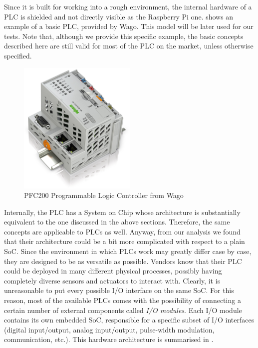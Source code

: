 Since it is built for working into a rough environment, the internal hardware of a PLC is shielded and not directly visible as the Raspberry Pi one.
\myfig{\ref{fig:wagoplc}} shows an example of a basic PLC, provided by Wago. This model will be later used for our tests.
Note that, although we provide this specific example, the basic concepts described here are still valid for most of the PLC on the market, unless otherwise specified.

\begin{figure}[h]
\centerline{\includegraphics[width=0.5\textwidth]{res/wagoplc}}
\caption{PFC200 Programmable Logic Controller from Wago \label{fig:wagoplc}}
\end{figure}

Internally, the PLC has a System on Chip whose architecture is substantially equivalent to the one discussed in the above sections.
Therefore, the same concepts are applicable to PLCs as well.
Anyway, from our analysis we found that their architecture could be a bit more complicated with respect to a plain SoC.
Since the environment in which PLCs work may greatly differ case by case, they are designed to be as versatile as possible.
Vendors know that their PLC could be deployed in many different physical processes, possibly having completely diverse sensors and actuators to interact with.
Clearly, it is unreasonable to put every possible I/O interface on the same SoC. For this reason, most of the available PLCs comes with the possibility
of connecting a certain number of external components called \emph{I/O modules}. Each I/O module contains its own embedded SoC,
responsible for a specific subset of I/O interfaces (\eg digital input/output, analog input/output, pulse-width modulation, communication, etc.).
This hardware architecture is summarised in \myfig{\ref{fig:plc_arch}}.

